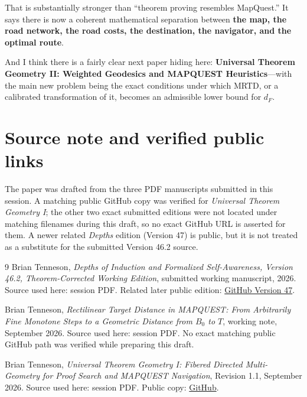 \documentclass[11pt]{article}
\theoremstyle{definition}
\theoremstyle{remark}
\begin{document}
That is substantially stronger than ``theorem proving resembles MapQuest.'' It says there is now a coherent mathematical separation between \textbf{the map, the road network, the road costs, the destination, the navigator, and the optimal route}.

And I think there is a fairly clear next paper hiding here: \textbf{Universal Theorem Geometry II: Weighted Geodesics and MAPQUEST Heuristics}---with the main new problem being the exact conditions under which MRTD, or a calibrated transformation of it, becomes an admissible lower bound for $d_F$.

\section{Source note and verified public links}

The paper was drafted from the three PDF manuscripts submitted in this session. A matching public GitHub copy was verified for \emph{Universal Theorem Geometry I}; the other two exact submitted editions were not located under matching filenames during this draft, so no exact GitHub URL is asserted for them. A newer related \emph{Depths} edition (Version 47) is public, but it is not treated as a substitute for the submitted Version 46.2 source.

\begin{thebibliography}{9}
Brian Tenneson, \emph{Depths of Induction and Formalized Self-Awareness, Version 46.2, Theorem-Corrected Working Edition}, submitted working manuscript, 2026. Source used here: session PDF. Related later public edition: \href{https://github.com/btenneson/pub/blob/main/cs.LO_Logic_in_Computer_Science/Depths_of_Induction_ML_Guided_Proof_Search_and_Formalized_Self_Awareness_Version_47.pdf}{GitHub Version 47}.

Brian Tenneson, \emph{Rectilinear Target Distance in MAPQUEST: From Arbitrarily Fine Monotone Steps to a Geometric Distance from $B_0$ to $T$}, working note, September 2026. Source used here: session PDF. No exact matching public GitHub path was verified while preparing this draft.

Brian Tenneson, \emph{Universal Theorem Geometry I: Fibered Directed Multi-Geometry for Proof Search and MAPQUEST Navigation}, Revision 1.1, September 2026. Source used here: session PDF. Public copy: \href{https://github.com/btenneson/pub/blob/main/cs.LO_Logic_in_Computer_Science/Universal_Theorem_Geometry_I.pdf}{GitHub}.
\end{thebibliography}
\end{document}
